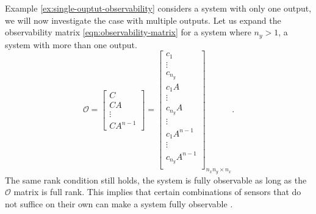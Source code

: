 Example \ref{ex:single-ouptut-observability} considers a system with only one output, we will now investigate the case with multiple outputs. Let us expand the observability matrix \eqref{eqn:observability-matrix} for a system where $n_y>1$, a system with more than one output.
\begin{equation*}
\mathcal{O}=
\begin{bmatrix}
    C \\
    CA \\
    \vdots \\
    CA^{n-1}
\end{bmatrix}    
=
\begin{bmatrix}
    c_1 \\
    \vdots \\
    c_{n_y} \\
    c_1A \\
    \vdots \\
    c_{n_y}A \\
    \vdots \\
    c_1A^{n-1}\\
    \vdots \\
    c_{n_y}A^{n-1} \\
\end{bmatrix}_{n_xn_y \times n_x}.
\end{equation*}
The same rank condition still holds, the system is fully observable as long as the $\mathcal{O}$ matrix is full rank. This implies that certain combinations of sensors that do not suffice on their own can make a system fully observable \cite[Section 3.4 D 2]{Antsaklis2006LinearSystems}.

